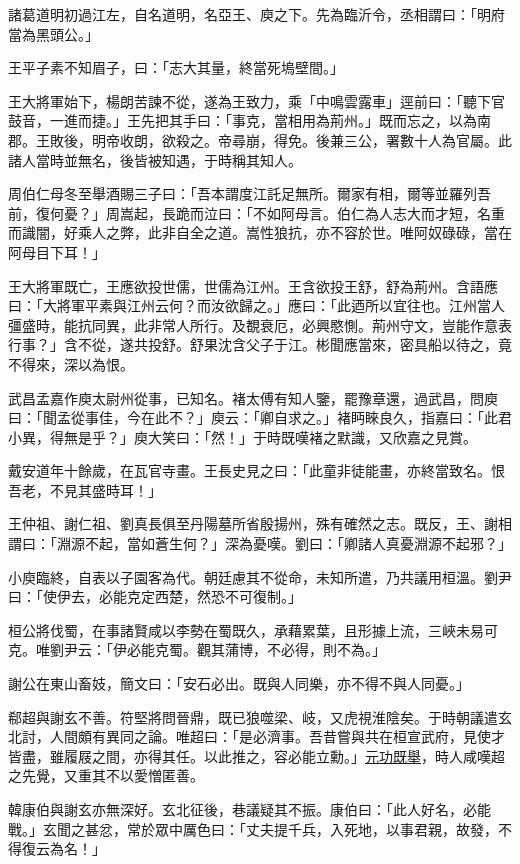 諸葛道明初過江左，自名道明，名亞王、庾之下。先為臨沂令，丞相謂曰：「明府當為黑頭公。」

王平子素不知眉子，曰：「志大其量，終當死塢壁間。」

王大將軍始下，楊朗苦諫不從，遂為王致力，乘「中鳴雲露車」逕前曰：「聽下官鼓音，一進而捷。」王先把其手曰：「事克，當相用為荊州。」既而忘之，以為南郡。王敗後，明帝收朗，欲殺之。帝尋崩，得免。後兼三公，署數十人為官屬。此諸人當時並無名，後皆被知遇，于時稱其知人。

周伯仁母冬至舉酒賜三子曰：「吾本謂度江託足無所。爾家有相，爾等並羅列吾前，復何憂？」周嵩起，長跪而泣曰：「不如阿母言。伯仁為人志大而才短，名重而識闇，好乘人之弊，此非自全之道。嵩性狼抗，亦不容於世。唯阿奴碌碌，當在阿母目下耳！」

王大將軍既亡，王應欲投世儒，世儒為江州。王含欲投王舒，舒為荊州。含語應曰：「大將軍平素與江州云何？而汝欲歸之。」應曰：「此迺所以宜往也。江州當人彊盛時，能抗同異，此非常人所行。及覩衰厄，必興愍惻。荊州守文，豈能作意表行事？」含不從，遂共投舒。舒果沈含父子于江。彬聞應當來，密具船以待之，竟不得來，深以為恨。

武昌孟嘉作庾太尉州從事，已知名。褚太傅有知人鑒，罷豫章還，過武昌，問庾曰：「聞孟從事佳，今在此不？」庾云：「卿自求之。」褚眄睞良久，指嘉曰：「此君小異，得無是乎？」庾大笑曰：「然！」于時既嘆褚之默識，又欣嘉之見賞。

戴安道年十餘歲，在瓦官寺畫。王長史見之曰：「此童非徒能畫，亦終當致名。恨吾老，不見其盛時耳！」

王仲祖、謝仁祖、劉真長俱至丹陽墓所省殷揚州，殊有確然之志。既反，王、謝相謂曰：「淵源不起，當如蒼生何？」深為憂嘆。劉曰：「卿諸人真憂淵源不起邪？」

小庾臨終，自表以子園客為代。朝廷慮其不從命，未知所遣，乃共議用桓溫。劉尹曰：「使伊去，必能克定西楚，然恐不可復制。」

桓公將伐蜀，在事諸賢咸以李勢在蜀既久，承藉累葉，且形據上流，三峽未易可克。唯劉尹云：「伊必能克蜀。觀其蒲博，不必得，則不為。」

謝公在東山畜妓，簡文曰：「安石必出。既與人同樂，亦不得不與人同憂。」

郗超與謝玄不善。符堅將問晉鼎，既已狼噬梁、岐，又虎視淮陰矣。于時朝議遣玄北討，人間頗有異同之論。唯超曰：「是必濟事。吾昔嘗與共在桓宣武府，見使才皆盡，雖履屐之間，亦得其任。以此推之，容必能立勳。」\href{https://zh.wikipedia.org/wiki/zh:\%E6\%B7\%9D\%E6\%B0\%B4\%E4\%B9\%8B\%E6\%88\%B0}{元功既舉}，時人咸嘆超之先覺，又重其不以愛憎匿善。

韓康伯與謝玄亦無深好。玄北征後，巷議疑其不振。康伯曰：「此人好名，必能戰。」玄聞之甚忿，常於眾中厲色曰：「丈夫提千兵，入死地，以事君親，故發，不得復云為名！」

